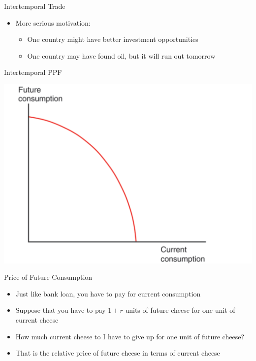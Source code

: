 \documentclass[ignorenonframetext,]{beamer}
\begin{document}
\begin{frame}{Intertemporal Trade}

    \begin{itemize}
        \item More serious motivation:
        \begin{itemize}
            \item One country might have better investment opportunities
            \item One country may have found oil, but it will run out tomorrow
        \end{itemize}
    \end{itemize}
            
\end{frame}

\begin{frame}{Intertemporal PPF}

    \includegraphics[scale=0.25]{intertemporal_ppf.png}

\end{frame}

\begin{frame}{Price of Future Consumption}

    \begin{itemize}
        \item Just like bank loan, you have to pay for current consumption 
        \item Suppose that you have to pay $1+r$ units of future cheese for one unit of current cheese
        \item How much current cheese to I have to give up for one unit of future cheese?
        \item That is the relative price of future cheese in terms of current cheese
    \end{itemize}

\end{frame}
\end{document}
